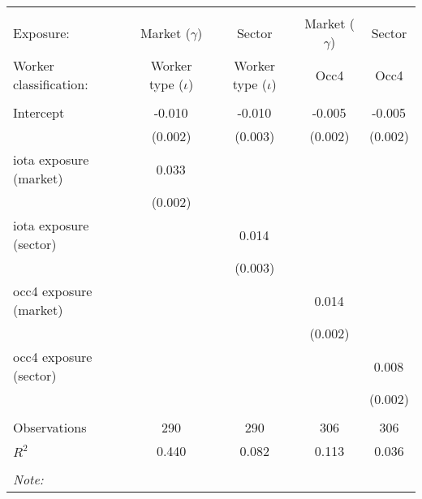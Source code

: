 \begin{tabular}{@{\extracolsep{5pt}}lcccc}
\\[-1.8ex]\hline
\hline \\[-1.8ex]
\hline \\[-1.8ex]
 Exposure: & Market ($\gamma$) & Sector & Market ($\gamma$) & Sector \\
 Worker classification: & Worker type ($\iota$) & Worker type ($\iota$) & Occ4 & Occ4 \\
 \hline &  &  &  &  \\
 Intercept & -0.010$^{}$ & -0.010$^{}$ & -0.005$^{}$ & -0.005$^{}$ \\
  & (0.002) & (0.003) & (0.002) & (0.002) \\
 iota exposure (market) & 0.033$^{}$ & & & \\
  & (0.002) & & & \\
 iota exposure (sector) & & 0.014$^{}$ & & \\
  & & (0.003) & & \\
 occ4 exposure (market) & & & 0.014$^{}$ & \\
  & & & (0.002) & \\
 occ4 exposure (sector) & & & & 0.008$^{}$ \\
  & & & & (0.002) \\
\hline \\[-1.8ex]
 Observations & 290 & 290 & 306 & 306 \\
 $R^2$ & 0.440 & 0.082 & 0.113 & 0.036 \\
\hline
\hline \\[-1.8ex]
\textit{Note:}\end{tabular}